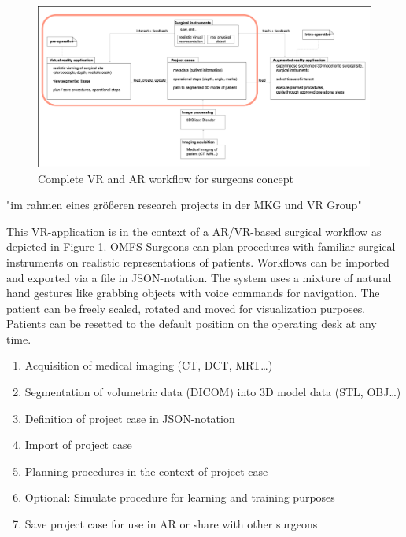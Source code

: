 \begin{figure}[ht!]
    \centering
    \includegraphics[width=\linewidth]{images/project_plan.png}
    \caption{\label{fig::ProjectPlan} Complete VR and AR workflow for surgeons concept}
\end{figure}

"im rahmen eines größeren research projects in der MKG und VR Group"

This VR-application is in the context of a AR/VR-based surgical workflow as depicted in Figure \ref{fig::ProjectPlan}.
OMFS-Surgeons can plan procedures with familiar surgical instruments on realistic representations of patients.
Workflows can be imported and exported via a file in JSON-notation.
The system uses a mixture of natural hand gestures like grabbing objects with voice commands for navigation.
The patient can be freely scaled, rotated and moved for visualization purposes.
Patients can be resetted to the default position on the operating desk at any time.

\begin{enumerate}
    \setlength\itemsep{-0.5em}
    \item Acquisition of medical imaging (CT, DCT, MRT\ldots)
    \item Segmentation of volumetric data (DICOM) into 3D model data (STL, OBJ\ldots)
    \item Definition of project case in JSON-notation
    \item Import of project case
    \item Planning procedures in the context of project case
    \item Optional: Simulate procedure for learning and training purposes
    \item Save project case for use in AR or share with other surgeons
\end{enumerate}

